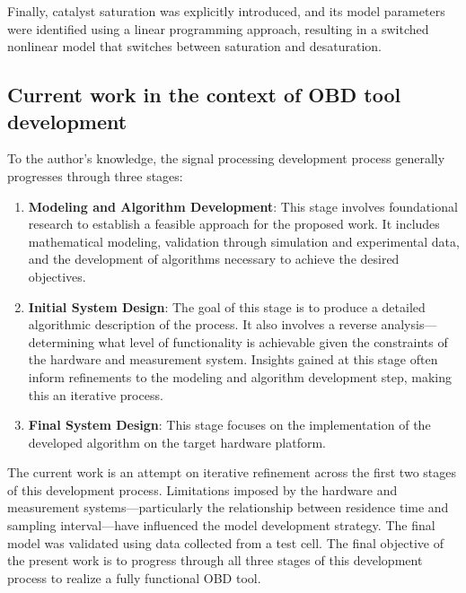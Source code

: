 Finally, catalyst saturation was explicitly introduced, and its model parameters were identified using a linear
programming approach, resulting in a switched nonlinear model that switches between saturation and desaturation.


\subsection{Current work in the context of OBD tool development}

To the author's knowledge, the signal processing development process generally progresses through three stages:
\begin{enumerate}
        \item \textbf{Modeling and Algorithm Development}: This stage involves foundational research to establish a
                feasible approach for the proposed work. It includes mathematical modeling, validation through
                simulation and experimental data, and the development of algorithms necessary to achieve the desired
                objectives.

        \item \textbf{Initial System Design}: The goal of this stage is to produce a detailed algorithmic description of
                the process. It also involves a reverse analysis—determining what level of functionality is achievable
                given the constraints of the hardware and measurement system. Insights gained at this stage often inform
                refinements to the modeling and algorithm development step, making this an iterative process.

        \item \textbf{Final System Design}: This stage focuses on the implementation of the developed algorithm on the
                target hardware platform.
\end{enumerate}
The current work is an attempt on iterative refinement across the first two stages of this development process.
Limitations imposed by the hardware and measurement systems—particularly the relationship between residence time and
sampling interval—have influenced the model development strategy. The final model was validated using data collected
from a test cell. The final objective of the present work is to progress through all three stages of this development process to realize a fully functional OBD tool.
